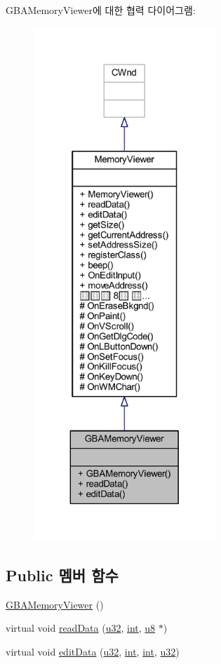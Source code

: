 G\+B\+A\+Memory\+Viewer에 대한 협력 다이어그램\+:\nopagebreak
\begin{figure}[H]
\begin{center}
\leavevmode
\includegraphics[height=550pt]{class_g_b_a_memory_viewer__coll__graph}
\end{center}
\end{figure}
\subsection*{Public 멤버 함수}
\begin{DoxyCompactItemize}
\item 
\mbox{\hyperlink{class_g_b_a_memory_viewer_a00911f11f334d2357bdbb5eaa968f868}{G\+B\+A\+Memory\+Viewer}} ()
\item 
virtual void \mbox{\hyperlink{class_g_b_a_memory_viewer_a443f550e4a3a065a0ae3a1142c678e91}{read\+Data}} (\mbox{\hyperlink{_system_8h_a10e94b422ef0c20dcdec20d31a1f5049}{u32}}, \mbox{\hyperlink{_util_8cpp_a0ef32aa8672df19503a49fab2d0c8071}{int}}, \mbox{\hyperlink{_system_8h_aed742c436da53c1080638ce6ef7d13de}{u8}} $\ast$)
\item 
virtual void \mbox{\hyperlink{class_g_b_a_memory_viewer_a6bfb5ccea3b6f87c3b186149538ad709}{edit\+Data}} (\mbox{\hyperlink{_system_8h_a10e94b422ef0c20dcdec20d31a1f5049}{u32}}, \mbox{\hyperlink{_util_8cpp_a0ef32aa8672df19503a49fab2d0c8071}{int}}, \mbox{\hyperlink{_util_8cpp_a0ef32aa8672df19503a49fab2d0c8071}{int}}, \mbox{\hyperlink{_system_8h_a10e94b422ef0c20dcdec20d31a1f5049}{u32}})
\end{DoxyCompactItemize}
